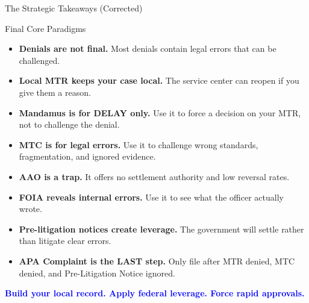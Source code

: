 \documentclass[11pt]{beamer}
\begin{document}
	
	\begin{frame}{The Strategic Takeaways (Corrected)}
		\scriptsize
		\begin{block}{Final Core Paradigms}
			\begin{itemize}
				\item \textbf{Denials are not final.} Most denials contain legal errors that can be challenged.
				\item \textbf{Local MTR keeps your case local.} The service center can reopen if you give them a reason.
				\item \textbf{Mandamus is for DELAY only.} Use it to force a decision on your MTR, not to challenge the denial.
				\item \textbf{MTC is for legal errors.} Use it to challenge wrong standards, fragmentation, and ignored evidence.
				\item \textbf{AAO is a trap.} It offers no settlement authority and low reversal rates.
				\item \textbf{FOIA reveals internal errors.} Use it to see what the officer actually wrote.
				\item \textbf{Pre-litigation notices create leverage.} The government will settle rather than litigate clear errors.
				\item \textbf{APA Complaint is the LAST step.} Only file after MTR denied, MTC denied, and Pre-Litigation Notice ignored.
			\end{itemize}
			\vspace{0.3cm}
			\centering
			\textcolor{blue}{\textbf{Build your local record. Apply federal leverage. Force rapid approvals.}}
		\end{block}
	\end{frame}
	
\end{document}
